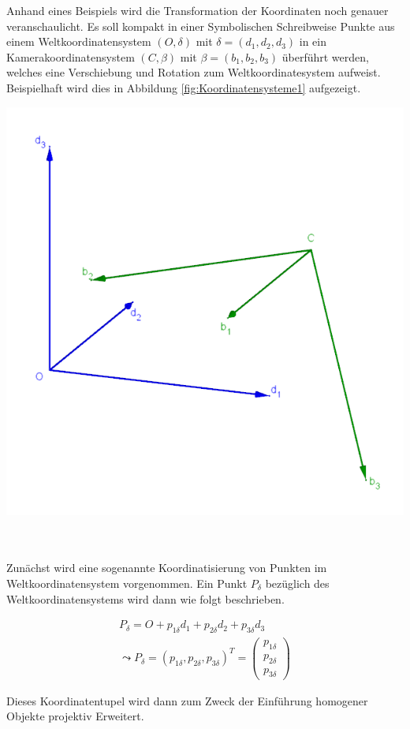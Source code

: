 Anhand eines Beispiels wird die Transformation der Koordinaten noch genauer veranschaulicht. Es soll kompakt in einer Symbolischen Schreibweise Punkte aus einem Weltkoordinatensystem  
$(O,\delta)$ mit $\delta = (d_1,d_2,d_3)$ in ein Kamerakoordinatensystem  $(C,\beta)$ mit $\beta = (b_1,b_2,b_3)$ überführt werden, welches eine Verschiebung und Rotation zum Weltkoordinatesystem aufweist. Beispielhaft wird dies in Abbildung \ref{fig:Koordinatensysteme1} aufgezeigt.
 
	\begin{minipage}{\linewidth}
		\centering
		\includegraphics[width=0.6\linewidth]{images/WeltKordSys.png}
		\label{fig:Koordinatensysteme1}
	\end{minipage}\\ \\
	
	
Zunächst wird eine sogenannte Koordinatisierung von Punkten im Weltkoordinatensystem vorgenommen. Ein Punkt $P_\delta$ bezüglich des Weltkoordinatensystems wird dann wie folgt beschrieben.

	
	\begin{gather}
	P_\delta = O + p_{1\delta}d_1 + p_{2\delta}d_2 + p_{3\delta}d_3\\
	\leadsto P_\delta = (p_{1\delta},p_{2\delta},p_{3\delta})^T = \begin{pmatrix} p_{1\delta} \\ p_{2\delta} \\ p_{3\delta} \end{pmatrix}
	\end{gather}
	
	Dieses Koordinatentupel wird dann zum Zweck der Einführung homogener Objekte projektiv Erweitert.
	
